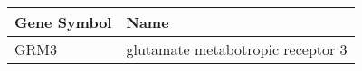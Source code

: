 \begin{tabular}{ll}
\toprule
Gene Symbol &                              Name \\
\midrule
       GRM3 & glutamate metabotropic receptor 3 \\
\bottomrule
\end{tabular}
